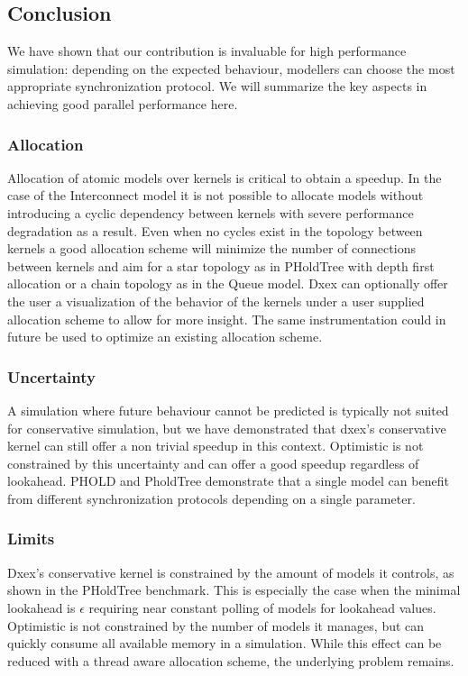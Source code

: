 \subsection{Conclusion}
We have shown that our contribution is invaluable for high performance simulation: depending on the expected behaviour, modellers can choose the most appropriate synchronization protocol.
We will summarize the key aspects in achieving good parallel performance here. %
\subsubsection{Allocation}
Allocation of atomic models over kernels is critical to obtain a speedup. In the case of the Interconnect model it is not possible to allocate models without introducing a cyclic dependency between kernels with severe performance degradation as a result. 
Even when no cycles exist in the topology between kernels a good allocation scheme will minimize the number of connections between kernels and aim for a star topology as in PHoldTree with depth first allocation or a chain topology as in the Queue model. 
Dxex can optionally offer the user a visualization of the behavior of the kernels under a user supplied allocation scheme to allow for more insight. 
The same instrumentation could in future be used to optimize an existing allocation scheme.
\subsubsection{Uncertainty}
A simulation where future behaviour cannot be predicted is typically not suited for conservative simulation, but we have demonstrated that dxex's conservative kernel can still offer a non trivial speedup in this context. 
Optimistic is not constrained by this uncertainty and can offer a good speedup regardless of lookahead. 
PHOLD and PholdTree demonstrate that a single model can benefit from different synchronization protocols depending on a single parameter.
\subsubsection{Limits}
Dxex's conservative kernel is constrained by the amount of models it controls, as shown in the PHoldTree benchmark. This is especially the case when the minimal lookahead is $\epsilon$ requiring near constant polling of models for lookahead values. 
Optimistic is not constrained by the number of models it manages, but can quickly consume all available memory in a simulation. While this effect can be reduced with a thread aware allocation scheme, the underlying problem remains.
